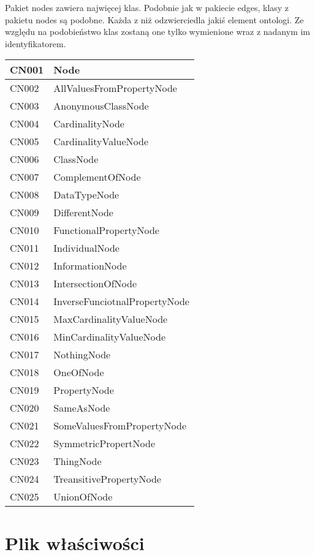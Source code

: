 Pakiet nodes zawiera najwięcej klas. Podobnie jak w pakiecie edges, klasy z pakietu nodes są podobne. Każda z niż odzwierciedla jakiś element ontologi.
 Ze względu na podobieństwo klas zostaną one tylko wymienione wraz z nadanym im identyfikatorem. 

\begin{longtable}{|m{4cm}|m{8cm}|} \hline
CN001  & Node  \\ \hline
CN002  & AllValuesFromPropertyNode \\ \hline
CN003  & AnonymousClassNode \\ \hline
CN004  & CardinalityNode \\ \hline
CN005  & CardinalityValueNode \\ \hline
CN006  & ClassNode \\ \hline
CN007  & ComplementOfNode \\ \hline
CN008  & DataTypeNode \\ \hline
CN009  & DifferentNode \\ \hline
CN010  & FunctionalPropertyNode \\ \hline
CN011  & IndividualNode \\ \hline
CN012  & InformationNode \\ \hline
CN013  & IntersectionOfNode \\ \hline 
CN014  & InverseFunciotnalPropertyNode \\ \hline 
CN015  & MaxCardinalityValueNode \\ \hline 
CN016  & MinCardinalityValueNode \\ \hline 
CN017  & NothingNode \\ \hline 
CN018  & OneOfNode \\ \hline 
CN019  & PropertyNode \\ \hline 
CN020  & SameAsNode \\ \hline 
CN021  & SomeValuesFromPropertyNode \\ \hline 
CN022  & SymmetricPropertNode \\ \hline 
CN023  & ThingNode \\ \hline 
CN024  & TreansitivePropertyNode \\ \hline 
CN025  & UnionOfNode \\ \hline 




\end{longtable}


\section {Plik właściwości}

